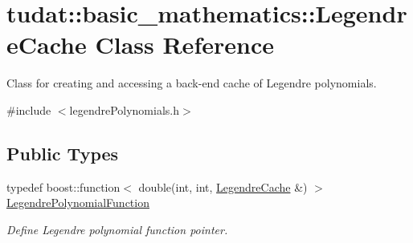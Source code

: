 \hypertarget{classtudat_1_1basic__mathematics_1_1LegendreCache}{}\section{tudat\+:\+:basic\+\_\+mathematics\+:\+:Legendre\+Cache Class Reference}
\label{classtudat_1_1basic__mathematics_1_1LegendreCache}


Class for creating and accessing a back-\/end cache of Legendre polynomials.  




{\ttfamily \#include $<$legendre\+Polynomials.\+h$>$}

\subsection*{Public Types}
\begin{DoxyCompactItemize}
\item 
typedef boost\+::function$<$ double(int, int, \hyperlink{classtudat_1_1basic__mathematics_1_1LegendreCache}{Legendre\+Cache} \&) $>$ \hyperlink{classtudat_1_1basic__mathematics_1_1LegendreCache_aa09fa0b6f9b5fc3ce708d5f365d0f6f4}{Legendre\+Polynomial\+Function}\hypertarget{classtudat_1_1basic__mathematics_1_1LegendreCache_aa09fa0b6f9b5fc3ce708d5f365d0f6f4}{}\label{classtudat_1_1basic__mathematics_1_1LegendreCache_aa09fa0b6f9b5fc3ce708d5f365d0f6f4}

\begin{DoxyCompactList}\small\item\em Define Legendre polynomial function pointer. \end{DoxyCompactList}\end{DoxyCompactItemize}
